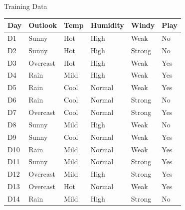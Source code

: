 \documentclass[usenames,dvipsnames]{beamer}
\begin{document}
\begin{frame}{Training Data}
\begin{center}    
\begin{tabular}{lllll||l} \toprule
\textbf{Day} & \textbf{Outlook}  & \textbf{Temp} & \textbf{Humidity} & \textbf{Windy}  & \textbf{Play} \\ \midrule
D1  & Sunny    & Hot  & High     & Weak   & No   \\
D2  & Sunny    & Hot  & High     & Strong & No   \\
D3  & Overcast & Hot  & High     & Weak   & Yes  \\
D4  & Rain     & Mild & High     & Weak   & Yes  \\
D5  & Rain     & Cool & Normal   & Weak   & Yes  \\
D6  & Rain     & Cool & Normal   & Strong & No   \\
D7  & Overcast & Cool & Normal   & Strong & Yes  \\
D8  & Sunny    & Mild & High     & Weak   & No   \\
D9  & Sunny    & Cool & Normal   & Weak   & Yes  \\
D10 & Rain     & Mild & Normal   & Weak   & Yes  \\
D11 & Sunny    & Mild & Normal   & Strong & Yes  \\
D12 & Overcast & Mild & High     & Strong & Yes  \\
D13 & Overcast & Hot  & Normal   & Weak   & Yes  \\
D14 & Rain     & Mild & High     & Strong & No  \\ \bottomrule
\end{tabular}
\end{center}
\end{frame}
\end{document}
